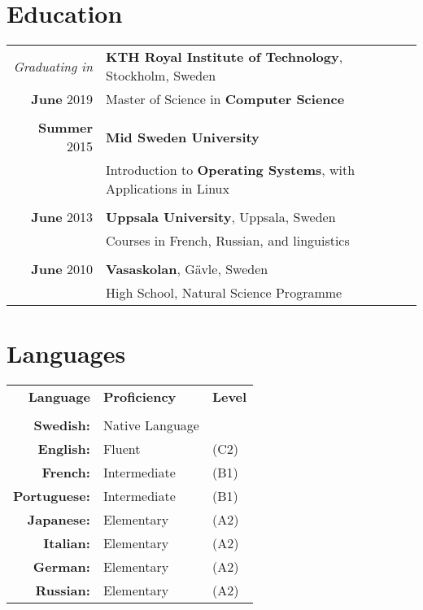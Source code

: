 \documentclass[a4paper,10pt]{article}
\begin{document}
\section{Education}
\begin{tabular}{r|l}
\emph{Graduating in} & \textbf{KTH Royal Institute of Technology}, Stockholm, Sweden\\	
 \textbf{June} 2019 & Master of Science in \textbf{Computer Science}\\&\\
\textbf{Summer} 2015& \textbf{Mid Sweden University}\\& Introduction to \textbf{Operating Systems}, with Applications in Linux\\&\\
\textbf{June} 2013& \textbf{Uppsala University}, Uppsala, Sweden\\& Courses in French, Russian, and linguistics\\&\\
\textbf{June} 2010& \textbf{Vasaskolan}, Gävle, Sweden \\& High School, Natural Science Programme
\end{tabular}

\section{Languages}
\begin{tabular}{rll}
\large\textbf{Language}&\large\textbf{Proficiency}&\large\textbf{Level}\\
\\
\textbf{Swedish:}&Native Language\\
\textbf{English:}&Fluent&(C2)\\
\textbf{French:}&Intermediate&(B1)\\
\textbf{Portuguese:}&Intermediate&(B1)\\
\textbf{Japanese:}&Elementary&(A2)\\
\textbf{Italian:}&Elementary&(A2)\\
\textbf{German:}&Elementary&(A2) \\
\textbf{Russian:}&Elementary&(A2)
\end{tabular}
\end{document}

